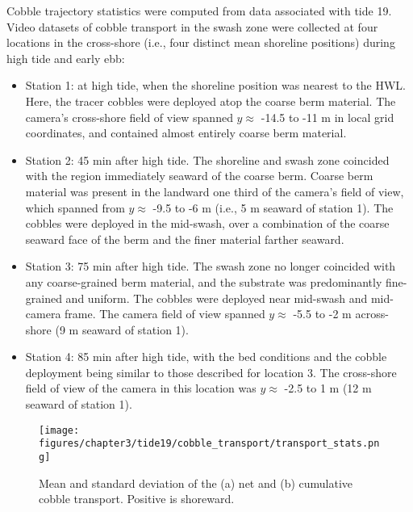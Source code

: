 Cobble trajectory statistics were computed from data associated with tide 19. Video datasets of cobble transport in the swash zone were collected at four locations in the cross-shore (i.e., four distinct mean shoreline positions) during high tide and early ebb: 

\begin{itemize}
	\item Station 1: at high tide, when the shoreline position was nearest to the HWL. Here, the tracer cobbles were deployed atop the coarse berm material. The camera's cross-shore field of view spanned $y\approx$ -14.5 to -11 m in local grid coordinates, and contained almost entirely coarse berm material. 
	\item Station 2: 45 min after high tide. The shoreline and swash zone coincided with the region immediately seaward of the coarse berm. Coarse berm material was present in the landward one third of the camera's field of view, which spanned from $y\approx$ -9.5 to -6 m (i.e., 5 m seaward of station 1). The cobbles were deployed in the mid-swash, over a combination of the coarse seaward face of the berm and the finer material farther seaward. 
	\item Station 3: 75 min after high tide. The swash zone no longer coincided with any coarse-grained berm material, and the substrate was predominantly fine-grained and uniform. The cobbles were deployed near mid-swash and mid-camera frame. The camera field of view spanned $y\approx$ -5.5 to -2 m across-shore (9 m seaward of station 1). 
	\item Station 4: 85 min after high tide, with the bed conditions and the cobble deployment being similar to those described for location 3. The cross-shore field of view of the camera in this location was $y\approx$ -2.5 to 1 m (12 m seaward of station 1).
\end{itemize}	

\begin{figure}[tbp] %
  	\texttt{[image: figures/chapter3/tide19/cobble\_transport/transport\_stats.png]} 	
 	\caption[Net and cumulative cobble transport]{Mean and standard deviation of the (a) net and (b) cumulative cobble transport. Positive is shoreward.}
 	\label{fig:cobble_transport_stats}
\end{figure}

